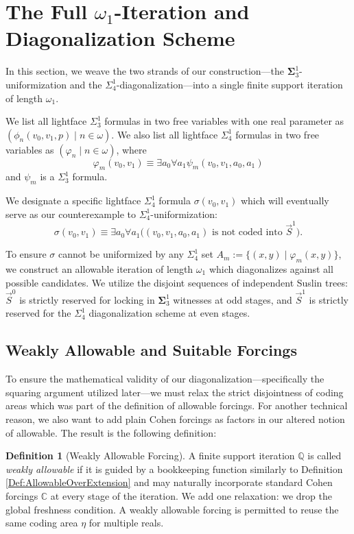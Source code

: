 \documentclass{article}
\theoremstyle{plain}
\theoremstyle{definition}
\newtheorem{definition}[theorem]{Definition}
\newcommand{\forceQ}{\mathbb{Q}}
\begin{document}
\section{The Full \texorpdfstring{$\omega_1$}{omega1}-Iteration and Diagonalization Scheme}

In this section, we weave the two strands of our construction---the $\mathbf{\Sigma}^1_3$-uniformization and the $\Sigma^1_4$-diagonalization---into a single finite support iteration of length $\omega_1$. 

We list all lightface $\Sigma^1_3$ formulas in two free variables with one real parameter as $(\phi_n(v_0,v_1,p) \mid n \in \omega)$. We also list all lightface $\Sigma^1_4$ formulas in two free variables as $(\varphi_n \mid n \in \omega )$, where \[ \varphi_m(v_0, v_1) \equiv \exists a_0 \forall a_1 \psi_m(v_0, v_1, a_0, a_1)\] and $\psi_m$ is a $\Sigma^1_3$ formula.

We designate a specific lightface $\Sigma^1_4$ formula $\sigma(v_0, v_1)$ which will eventually serve as our counterexample to $\Sigma^1_4$-uniformization:
\[ \sigma(v_0, v_1) \equiv \exists a_0 \forall a_1 \big( (v_0, v_1, a_0, a_1) \text{ is not coded into } \vec{S}^1 \big). \]

To ensure $\sigma$ cannot be uniformized by any $\Sigma^1_4$ set $A_m := \{(x,y) \mid \varphi_m(x,y)\}$, we construct an allowable iteration of length $\omega_1$ which diagonalizes against all possible candidates. We utilize the disjoint sequences of independent Suslin trees: $\vec{S}^0$ is strictly reserved for locking in $\mathbf{\Sigma}^1_3$ witnesses at odd stages, and $\vec{S}^1$ is strictly reserved for the $\Sigma^1_4$ diagonalization scheme at even stages.

\subsection{Weakly Allowable and Suitable Forcings}
To ensure the mathematical validity of our diagonalization---specifically the squaring argument utilized later---we must relax the strict disjointness of coding areas which was part of the definition of allowable forcings. For another technical reason, we also want to add plain Cohen forcings as factors in our altered notion of allowable. The result is the following definition:

\begin{definition}[Weakly Allowable Forcing]
A finite support iteration $\forceQ$ is called \emph{weakly allowable} if it is guided by a bookkeeping function similarly to Definition \ref{Def:AllowableOverExtension} and may naturally incorporate standard Cohen forcings $\mathbb{C}$ at every stage of the iteration. We add one relaxation: we  drop the {global  freshness condition}. A weakly allowable forcing is permitted to reuse the same coding area $\eta$ for multiple reals.
\end{definition}
\end{document}
